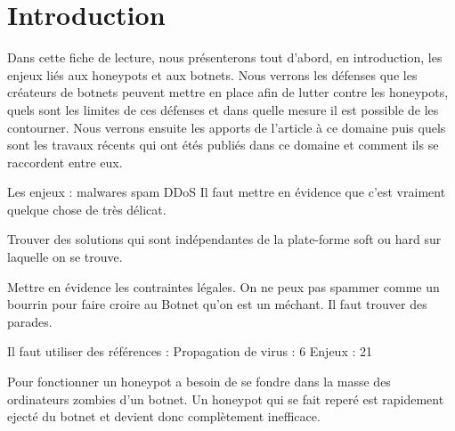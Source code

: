 \chapter*{Introduction}


Dans cette fiche de lecture, nous présenterons tout d'abord, en introduction, les enjeux liés aux honeypots et aux
botnets. Nous verrons les défenses que les créateurs de botnets peuvent mettre en place afin
de lutter contre les honeypots, quels sont les limites de ces défenses et dans quelle mesure il est possible 
de les contourner. Nous verrons ensuite les apports de l'article à ce domaine puis quels sont les travaux récents
qui ont étés publiés dans ce domaine et comment ils se raccordent entre eux.



Les enjeux :
malwares
spam
DDoS
Il faut mettre en évidence que c'est vraiment quelque chose de très délicat.

Trouver des solutions qui sont indépendantes de la plate-forme soft ou hard sur laquelle on se trouve.

Mettre en évidence les contraintes légales. On ne peux pas spammer comme un bourrin pour faire croire au Botnet qu'on est un
méchant. Il faut trouver des parades.


Il faut utiliser des références :
Propagation de virus : 6
Enjeux : 21

Pour fonctionner un honeypot a besoin de se fondre dans la masse des ordinateurs zombies d'un botnet.
Un honeypot qui se fait reperé est rapidement ejecté du botnet et devient donc complètement inefficace.

